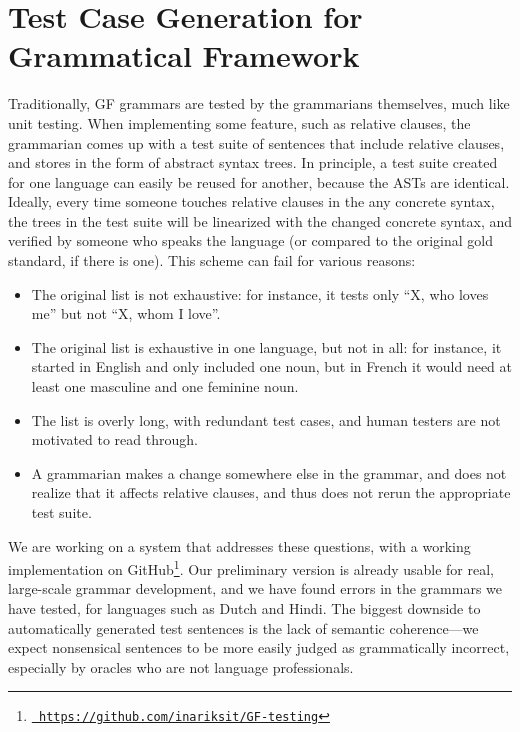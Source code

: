 \chapter{Test Case Generation for Grammatical Framework}
\label{chapterGFtest}

Traditionally, GF grammars are tested by the grammarians themselves,
much like unit testing. %
When implementing some feature, such as relative clauses, the grammarian
comes up with a test suite of sentences that include relative clauses, 
and stores in the form of abstract syntax trees. In principle, a test suite created for one
language can easily be reused for another, because the ASTs are identical.
Ideally, every time someone touches relative clauses in the any concrete syntax, the trees 
in the test suite will be linearized with the changed concrete syntax, and verified by 
someone who speaks the language (or compared to the original gold standard, if there is one).
This scheme can fail for various reasons:

\begin{itemize}
\item The original list is not exhaustive: for instance, it tests only ``X, who loves me'' but not ``X, whom I love''.
\item The original list is exhaustive in one language, but not in all: for instance, it started in English and only included one noun, but in French it would need at least one masculine and one feminine noun.
\item The list is overly long, with redundant test cases, and human testers are not motivated to read through.
\item A grammarian makes a change somewhere else in the grammar, and does not realize that it affects relative clauses, and thus does not rerun the appropriate test suite.
\end{itemize}

We are working on a system that addresses these questions, with a working implementation on GitHub\footnote{\texttt{\small \url{ https://github.com/inariksit/GF-testing}}}. 
Our preliminary version is already usable for real, large-scale grammar development, and we have found errors in the grammars we have tested, for languages such as Dutch and Hindi.
The biggest downside to automatically generated test sentences is the lack of semantic coherence---we expect nonsensical sentences to be more easily judged as grammatically incorrect, especially by oracles who are not language professionals.

